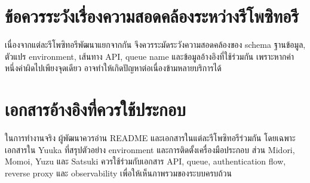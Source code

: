 \section{ข้อควรระวังเรื่องความสอดคล้องระหว่างรีโพซิทอรี}
\hspace*{1.3em}
เนื่องจากแต่ละรีโพซิทอรีพัฒนาแยกจากกัน จึงควรระมัดระวังความสอดคล้องของ schema ฐานข้อมูล, ตัวแปร environment, เส้นทาง API, queue name และข้อมูลอ้างอิงที่ใช้ร่วมกัน เพราะหากค่าหนึ่งค่าผิดไปเพียงจุดเดียว อาจทำให้เกิดปัญหาต่อเนื่องข้ามหลายบริการได้

\section{เอกสารอ้างอิงที่ควรใช้ประกอบ}
\hspace*{1.3em}
ในการทำงานจริง ผู้พัฒนาควรอ่าน README และเอกสารในแต่ละรีโพซิทอรีร่วมกัน โดยเฉพาะเอกสารใน Yuuka ที่สรุปตัวอย่าง environment และการติดตั้งเครื่องมือประกอบ ส่วน Midori, Momoi, Yuzu และ Satsuki ควรใช้ร่วมกับเอกสาร API, queue, authentication flow, reverse proxy และ observability เพื่อให้เห็นภาพรวมของระบบครบถ้วน

